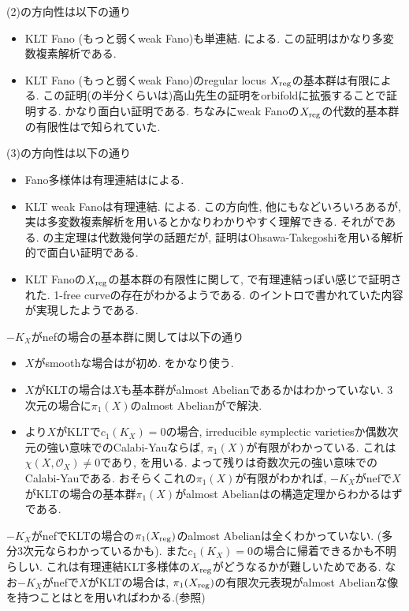 \documentclass[dvipdfmx,a4paper,11pt]{article} %
\theoremstyle{definition}
\theoremstyle{remark}
\numberwithin{equation}{section}
\newcommand{\reg}{{\rm{reg}}}
\begin{document}
(2)の方向性は以下の通り
\begin{itemize}
\item KLT Fano (もっと弱くweak Fano)も単連結. \cite{Tak00}による. この証明はかなり多変数複素解析である.
\item KLT Fano (もっと弱くweak Fano)のregular locus $X_\reg$の基本群は有限\cite{Bra21}による. この証明(の半分くらいは)高山先生の証明をorbifoldに拡張することで証明する. かなり面白い証明である. ちなみにweak Fanoの$X_{\reg}$の代数的基本群の有限性は\cite{Xu14}で知られていた. 
\end{itemize}
(3)の方向性は以下の通り
\begin{itemize}
\item Fano多様体は有理連結は\cite{Cam92, KMM92}による. 
\item KLT weak Fanoは有理連結. \cite{Zhang04}による. この方向性, 他にも\cite{BP11, EG19, CCM21, EIM21}などいろいろあるが, 実は多変数複素解析を用いるとかなりわかりやすく理解できる. それが\cite{Deng21}である. \cite{Deng21}の主定理は代数幾何学の話題だが, 証明はOhsawa-Takegoshiを用いる解析的で面白い証明である. 
\item KLT Fanoの$X_\reg$の基本群の有限性に関して, \cite{JLR25}で有理連結っぽい感じで証明された. 1-free curveの存在がわかるようである. \cite{Bra21}のイントロで書かれていた内容が実現したようである. 
\end{itemize}

$-K_X$がnefの場合の基本群に関しては以下の通り 
\begin{itemize}
\item $X$がsmoothな場合は\cite{Paun98}が初め. \cite{DPS96}をかなり使う. 
\item $X$がKLTの場合は$X$も基本群がalmost Abelianであるかはわかっていない. 3次元の場合に$\pi_{1}(X)$のalmost Abelianが\cite{FGSW26}で解決. 
\item \cite{GGK19, Cam21}より$X$がKLTで$c_1(K_X)=0$の場合,  irreducible symplectic varietiesか偶数次元の強い意味でのCalabi-Yauならば, $\pi_1(X)$が有限がわかっている. 
これは$\chi(X, \mathcal{O}_X) \neq 0$であり, \cite{Cam95}を用いる. よって残りは奇数次元の強い意味でのCalabi-Yauである. おそらくこれの$\pi_1(X)$が有限がわかれば, $-K_X$がnefで$X$がKLTの場合の基本群$\pi_1(X)$がalmost Abelianは\cite{MW21}の構造定理からわかるはずである. 
\end{itemize}

$-K_X$がnefでKLTの場合の$\pi_1(X_\reg)$のalmost Abelianは全くわかっていない. (多分3次元ならわかっているかも). また$c_1(K_X)=0$の場合に帰着できるかも不明らしい. これは有理連結KLT多様体の$X_\reg$がどうなるかが難しいためである. なお$-K_X$がnefで$X$がKLTの場合は, $\pi_1(X_\reg)$の有限次元表現がalmost Abelianな像を持つことは\cite{GGK19}と\cite{MW21}を用いればわかる.(\cite{IMM24}参照)  

\newpage




\end{document}
